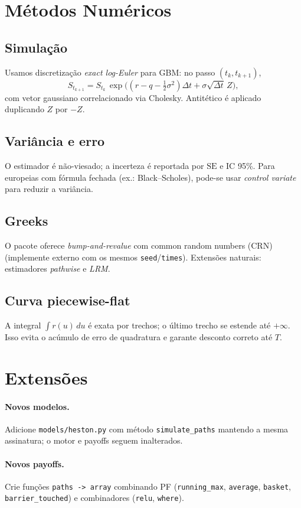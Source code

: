 \documentclass[11pt,a4paper]{article}
\begin{document}
\section{Métodos Numéricos}
\subsection{Simulação}
Usamos discretização \emph{exact log-Euler} para GBM: no passo $(t_k,t_{k+1})$,
\begin{equation}
S_{t_{k+1}} = S_{t_k}\,\exp\!\Big((r-q-\tfrac12\sigma^2)\Delta t + \sigma\sqrt{\Delta t}\,Z\Big),
\end{equation}
com vetor gaussiano correlacionado via Cholesky.
Antitético é aplicado duplicando $Z$ por $-Z$.
\subsection{Variância e erro}
O estimador é não-viesado; a incerteza é reportada por $\mathrm{SE}$ e IC 95\%.
Para europeias com fórmula fechada (ex.: Black--Scholes), pode-se usar \emph{control variate} para reduzir a variância.
\subsection{Greeks}
O pacote oferece \emph{bump-and-revalue} com common random numbers (CRN) (implemente externo com os mesmos \texttt{seed}/\texttt{times}).
Extensões naturais: estimadores \emph{pathwise} e \emph{LRM}.
\subsection{Curva piecewise-flat}
A integral $\int r(u)\,du$ é exata por trechos; o último trecho se estende até $+\infty$.
Isso evita o acúmulo de erro de quadratura e garante desconto correto até $T$.

\section{Extensões}
\paragraph{Novos modelos.} Adicione \texttt{models/heston.py} com método \texttt{simulate\_paths} mantendo a mesma assinatura;
o motor e payoffs seguem inalterados.
\paragraph{Novos payoffs.} Crie funções \verb|paths -> array| combinando PF (\texttt{running\_max}, \texttt{average}, \texttt{basket},
\texttt{barrier\_touched}) e combinadores (\texttt{relu}, \texttt{where}).
\end{document}
